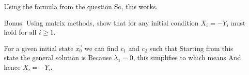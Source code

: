 \solution
Using the formula from the question
So, this works. 

\subquestion
Bonus: Using matrix methods, show that for any initial condition $X_i=-Y_i$ must hold for all $i\geq 1$.

\solution
For a given initial state $\vec{x_0}$ we can find $c_1$ and $c_2$ such that
Starting from this state the general solution is 
Because $\lambda_1=0$, this simplifies to 
which means
And hence $X_i=-Y_i$.

